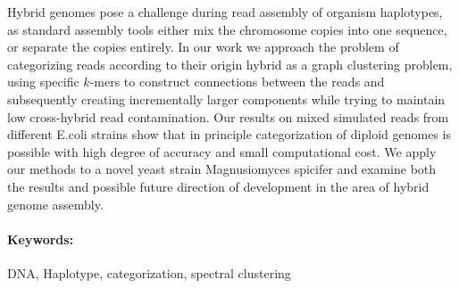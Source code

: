 \documentclass[12pt, oneside]{book}
\theoremstyle{definition}
\begin{document}
Hybrid genomes pose a challenge during read assembly of organism haplotypes, as standard assembly tools either mix the chromosome copies into one sequence, or separate the copies entirely.
In our work we approach the problem of categorizing reads according to their origin hybrid as a graph clustering problem, using specific $k$-mers to construct connections between the reads and subsequently creating incrementally larger components while trying to maintain low cross-hybrid read contamination. Our results on mixed simulated reads from different E.coli strains show that in principle categorization of diploid genomes is possible with high degree of accuracy and small computational cost. We apply our methods to a novel yeast strain Magnusiomyces spicifer and examine both the results and possible future direction of development in the area of hybrid genome assembly.

\paragraph*{Keywords:} DNA, Haplotype, categorization, spectral clustering




\newpage 

\tableofcontents



\newpage 

\listoffigures
\listoftables


\mainmatter



















\newpage	

\backmatter

\thispagestyle{empty}
\nocite{*}
\clearpage


 



%
% 
\end{document}
